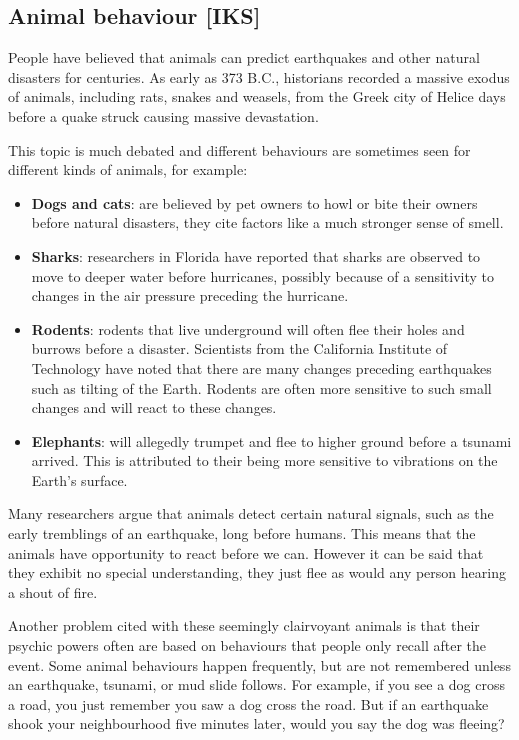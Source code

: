     \label{m38779*eip-745}
            \subsection*{Animal behaviour [IKS]}
            \nopagebreak
            \label{m38779*id1164126080746}People have believed that animals can predict earthquakes and other natural disasters for centuries. As early as 373 B.C., historians recorded a massive exodus of animals, including rats, snakes and weasels, from the Greek city of Helice days before a quake struck causing massive devastation.\par 
      \label{m38779*id1164126439136}This topic is much debated and different behaviours are sometimes seen for different kinds of animals, for example:\par 
      \label{m38779*id1164132827593}\begin{itemize}[noitemsep]
            \item \textbf{Dogs and cats}: are believed by pet owners to howl or bite their owners before natural disasters, they cite factors like a much stronger sense of smell.
\item \textbf{Sharks}: researchers in Florida have reported that sharks are observed to move to deeper water before hurricanes, possibly because of a sensitivity to changes in the air pressure preceding the hurricane.
\item \textbf{Rodents}: rodents that live underground will often flee their holes and burrows before a disaster. Scientists from the California Institute of Technology have noted that there are many changes preceding earthquakes such as tilting of the Earth. Rodents are often more sensitive to such small changes and will react to these changes.
\item \textbf{Elephants}: will allegedly trumpet and flee to higher ground before a tsunami arrived. This is attributed to their being more sensitive to vibrations on the Earth's surface. \end{itemize}
      \label{m38779*id1164121170251}Many researchers argue that animals detect certain natural signals, such as the early tremblings of an earthquake, long before humans. This means that the animals have opportunity to react before we can. However it can be said that they exhibit no special understanding, they just flee as would any person hearing a shout of fire.\par 
      \label{m38779*id6489198}Another problem cited with these seemingly clairvoyant animals is that their psychic powers often are based on behaviours that people only recall after the event. Some animal behaviours happen frequently, but are not remembered unless an earthquake, tsunami, or mud slide follows. For example, if you see a dog cross a road, you just remember you saw a dog cross the road. But if an earthquake shook your neighbourhood five minutes later, would you say the dog was fleeing? \par 
